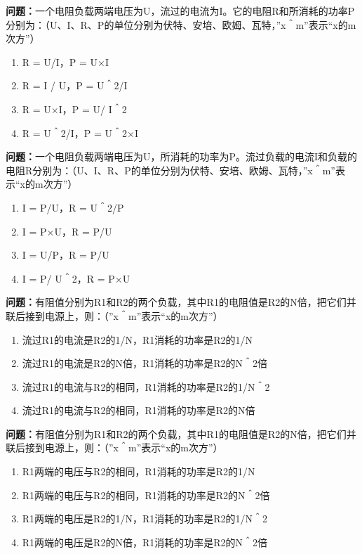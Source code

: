 \bigskip


\noindent\textbf{问题：}一个电阻负载两端电压为U，流过的电流为I。它的电阻R和所消耗的功率P分别为：（U、I、R、P的单位分别为伏特、安培、欧姆、瓦特，”x＾m”表示“x的m次方”）
\begin{enumerate}[label=\Alph*), leftmargin=3em]
\item R = U/I，P = U×I
\item R = I / U，P = U＾2/I
\item R = U×I，P = U/ I＾2
\item R = U＾2/I，P = U＾2×I
\end{enumerate}

\bigskip


\noindent\textbf{问题：}一个电阻负载两端电压为U，所消耗的功率为P。流过负载的电流I和负载的电阻R分别为：（U、I、R、P的单位分别为伏特、安培、欧姆、瓦特，”x＾m”表示“x的m次方”）
\begin{enumerate}[label=\Alph*), leftmargin=3em]
\item I = P/U，R = U＾2/P
\item I = P×U，R = P/U
\item I = U/P，R = P/U
\item I = P/ U＾2，R = P×U
\end{enumerate}

\bigskip


\noindent\textbf{问题：}有阻值分别为R1和R2的两个负载，其中R1的电阻值是R2的N倍，把它们并联后接到电源上，则：（”x＾m”表示“x的m次方”）
\begin{enumerate}[label=\Alph*), leftmargin=3em]
\item 流过R1的电流是R2的1/N，R1消耗的功率是R2的1/N
\item 流过R1的电流是R2的N倍，R1消耗的功率是R2的N＾2倍
\item 流过R1的电流与R2的相同，R1消耗的功率是R2的1/N＾2
\item 流过R1的电流与R2的相同，R1消耗的功率是R2的N倍
\end{enumerate}

\bigskip


\noindent\textbf{问题：}有阻值分别为R1和R2的两个负载，其中R1的电阻值是R2的N倍，把它们并联后接到电源上，则：（”x＾m”表示“x的m次方”）
\begin{enumerate}[label=\Alph*), leftmargin=3em]
\item R1两端的电压与R2的相同，R1消耗的功率是R2的1/N
\item R1两端的电压与R2的相同，R1消耗的功率是R2的N＾2倍
\item R1两端的电压是R2的1/N，R1消耗的功率是R2的1/N＾2
\item R1两端的电压是R2的N倍，R1消耗的功率是R2的N＾2倍
\end{enumerate}


